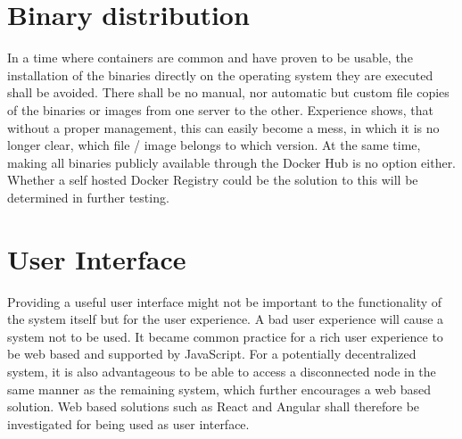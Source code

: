 \section{Binary distribution}

In a time where containers are common and have proven to be usable, the installation of the binaries directly on the operating system they are executed shall be avoided.
There shall be no manual, nor automatic but custom file copies of the binaries or images from one server to the other.
Experience shows, that without a proper management, this can easily become a mess, in which it is no longer clear, which file / image belongs to which version.
At the same time, making all binaries publicly available through the Docker Hub\cite{docker:hub} is no option either.
Whether a self hosted Docker Registry\cite{docker:registry} could be the solution to this will be determined in further testing.

\section{User Interface}

Providing a useful user interface might not be important to the functionality of the system itself but for the user experience.
A bad user experience will cause a system not to be used.
It became common practice for a rich user experience to be web based and supported by JavaScript.
For a potentially decentralized system, it is also advantageous to be able to access a disconnected node in the same manner as the remaining system, which further encourages a web based solution.
Web based solutions such as React and Angular shall therefore be investigated for being used as user interface.
